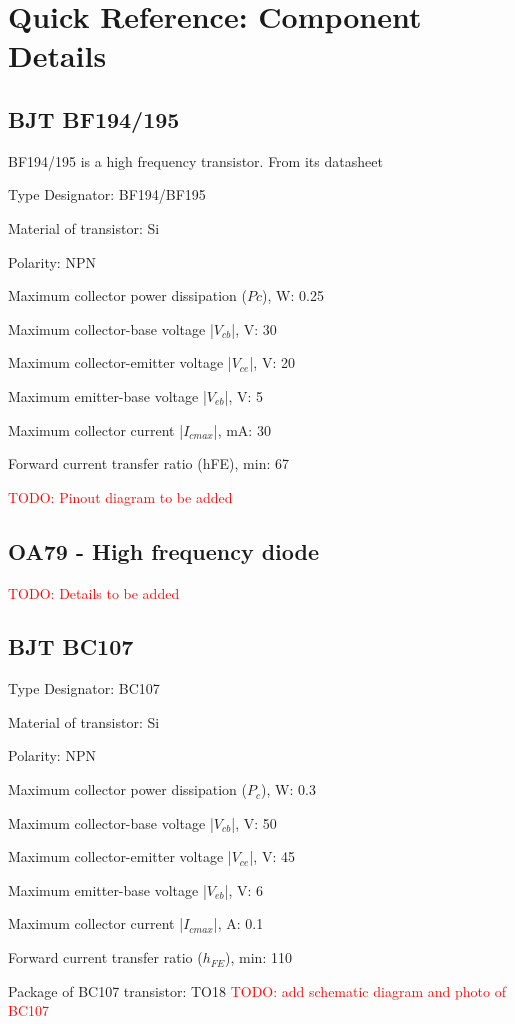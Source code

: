 \chapter {Quick Reference: Component Details}
\section{BJT BF194/195}
\label{BF194/195}
BF194/195 is a high frequency transistor. From its datasheet 

Type Designator: BF194/BF195

Material of transistor: Si

Polarity: NPN

Maximum collector power dissipation ($Pc$), W: 0.25

Maximum collector-base voltage |$V_{cb}$|, V: 30

Maximum collector-emitter voltage |$V_{ce}$|, V: 20

Maximum emitter-base voltage |$V_{eb}$|, V: 5

Maximum collector current |$I_{c max}$|, mA: 30

Forward current transfer ratio (hFE), min: 67

\textcolor{red}{TODO: Pinout diagram to be added}

\section{OA79 - High frequency diode}
\textcolor{red}{TODO: Details to be added}
\section{BJT BC107}
\label{BC107}
Type Designator: BC107

Material of transistor: Si

Polarity: NPN

Maximum collector power dissipation ($P_c$), W: 0.3

Maximum collector-base voltage |$V_{cb}$|, V: 50

Maximum collector-emitter voltage |$V_{ce}$|, V: 45

Maximum emitter-base voltage |$V_{eb}$|, V: 6

Maximum collector current |$I_{cmax}$|, A: 0.1

Forward current transfer ratio ($h_{FE}$), min: 110

Package of BC107 transistor: TO18
\textcolor{red}{TODO: add schematic diagram and photo of BC107}

